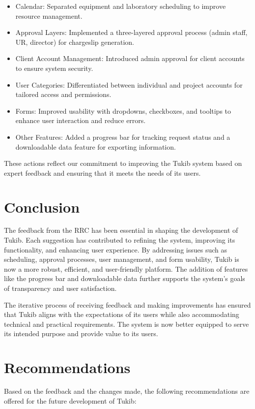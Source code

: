 \begin{itemize}
	\item Calendar: Separated equipment and laboratory scheduling to improve resource management.
	\item Approval Layers: Implemented a three-layered approval process (admin staff, UR, director) for chargeslip generation.
	\item Client Account Management: Introduced admin approval for client accounts to ensure system security.
	\item User Categories: Differentiated between individual and project accounts for tailored access and permissions.
	\item Forms: Improved usability with dropdowns, checkboxes, and tooltips to enhance user interaction and reduce errors.
	\item Other Features: Added a progress bar for tracking request status and a downloadable data feature for exporting information.
\end{itemize}

These actions reflect our commitment to improving the Tukib system based on expert feedback and ensuring that it meets the needs of its users.

\section{Conclusion}
The feedback from the RRC has been essential in shaping the development of Tukib. Each suggestion has contributed to refining the system, improving its functionality, and enhancing user experience. By addressing issues such as scheduling, approval processes, user management, and form usability, Tukib is now a more robust, efficient, and user-friendly platform. The addition of features like the progress bar and downloadable data further supports the system’s goals of transparency and user satisfaction.

The iterative process of receiving feedback and making improvements has ensured that Tukib aligns with the expectations of its users while also accommodating technical and practical requirements. The system is now better equipped to serve its intended purpose and provide value to its users.

\section{Recommendations}
Based on the feedback and the changes made, the following recommendations are offered for the future development of Tukib:

